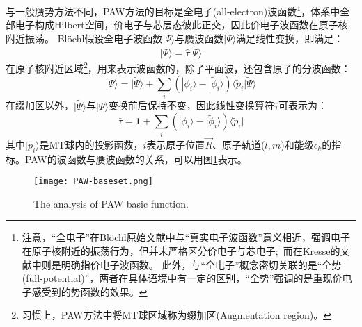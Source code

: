 与一般赝势方法不同，PAW方法的目标是全电子(all-electron)波函数\footnote{注意，“全电子”在\textrm{Bl\"ochl}原始文献中与“真实电子波函数”意义相近，强调电子在原子核附近的振荡行为，但并未严格区分价电子与芯电子;~而在\textrm{Kresse}的文献中则是明确指价电子波函数。%
此外，与“全电子”概念密切关联的是“全势(full-potential)”，两者在具体语境中有一定的区别，“全势”强调的是重现价电子感受到的势函数的效果。}，体系中全部电子构成\textrm{Hilbert}空间，价电子与芯层态彼此正交，因此价电子波函数在原子核附近振荡。
\textrm{Bl\"ochl}假设全电子波函数$|\Psi\rangle$与赝波函数$|\tilde\Psi\rangle$满足线性变换，即满足：
\begin{equation}
	|\Psi\rangle=\hat{\tau}|\tilde\Psi\rangle
	\label{eq:PAW-Blochl-01}
\end{equation}
在原子核附近区域\footnote{习惯上，PAW方法中将MT球区域称为缀加区(\textrm{Augmentation region})。}，用来表示波函数的，除了平面波，还包含原子的分波函数：
\begin{equation}
	|\Psi\rangle=|\tilde\Psi\rangle+\sum_i(|\phi_i\rangle-|\tilde\phi_i\rangle)\langle\tilde p_i|\tilde\Psi\rangle
	\label{eq:PAW-Blochl-02}
\end{equation}
在缀加区以外，$|\tilde\Psi\rangle$与$|\Psi\rangle$变换前后保持不变，因此线性变换算符$\hat{\tau}$可表示为：
\begin{equation}
	\hat{\tau}=\mathbf{1}+\sum_i(|\phi_i\rangle-|\tilde\phi_i\rangle)\langle\tilde p_i|
	\label{eq:PAW-Blochl-03}
\end{equation}
其中$|\tilde p_i\rangle$是\textrm{MT}球内的投影函数，$i$表示原子位置$\vec R$、原子轨道($l,m$)和能级$\epsilon_k$的指标。\textrm{PAW}的波函数与赝波函数的关系，可以用图\ref{PAW_basic}表示。
\begin{figure}[h!]
\centering
\texttt{[image: PAW-baseset.png]}
\caption{\small \textrm{The analysis of PAW basic function.}}%
\label{PAW_basic}
\end{figure}

